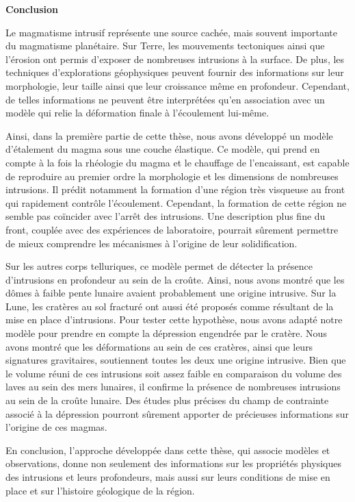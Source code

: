 \thispagestyle{plain}
\begin{center}
 \Large \vspace{.5cm} \textbf{Conclusion}
\end{center}

Le  magmatisme intrusif  représente  une source  cachée, mais  souvent
importante  du  magmatisme  planétaire.   Sur  Terre,  les  mouvements
tectoniques  ainsi que  l’érosion ont  permis d’exposer  de nombreuses
intrusions  à  la  surface.  De plus,  les  techniques  d'explorations
géophysiques peuvent  fournir des  informations sur  leur morphologie,
leur taille ainsi que leur  croissance même en profondeur.  Cependant,
de telles informations ne  peuvent être interprétées qu’en association
avec  un  modèle  qui  relie  la  déformation  finale  à  l’écoulement
lui-même.

Ainsi, dans la première partie de cette thèse, nous avons développé un
modèle d’étalement du magma sous  une couche élastique. Ce modèle, qui
prend en  compte à la  fois la rhéologie du  magma et le  chauffage de
l’encaissant,  est   capable  de   reproduire  au  premier   ordre  la
morphologie  et les  dimensions de  nombreuses intrusions.   Il prédit
notamment  la  formation d’une  région  très  visqueuse au  front  qui
rapidement contrôle  l’écoulement.  Cependant,  la formation  de cette
région  ne semble  pas  coïncider avec  l’arrêt  des intrusions.   Une
description  plus  fine du  front,  couplée  avec des  expériences  de
laboratoire,  pourrait  sûrement  permettre de  mieux  comprendre  les
mécanismes à l’origine de leur solidification.

Sur  les autres  corps telluriques,  ce modèle  permet de  détecter la
présence d’intrusions en profondeur au  sein de la croûte. Ainsi, nous
avons montré que les dômes à faible pente lunaire avaient probablement
une origine intrusive.  Sur la Lune,  les cratères au sol fracturé ont
aussi été proposés  comme résultant de la mise  en place d’intrusions.
Pour  tester cette  hypothèse,  nous avons  adapté  notre modèle  pour
prendre en compte la dépression  engendrée par le cratère.  Nous avons
montré que les  déformations au sein de ces cratères,  ainsi que leurs
signatures  gravitaires,  soutiennent  toutes  les  deux  une  origine
intrusive.   Bien que  le volume  réuni de  ces intrusions  soit assez
faible en comparaison  du volume des laves au sein  des mers lunaires,
il confirme la présence de nombreuses  intrusions au sein de la croûte
lunaire. Des études plus précises du  champ de contrainte associé à la
dépression pourront  sûrement apporter de précieuses  informations sur
l’origine de ces magmas.

En  conclusion, l’approche  développée dans  cette thèse,  qui associe
modèles et observations, donne non  seulement des informations sur les
propriétés physiques  des intrusions et leurs  profondeurs, mais aussi
sur leurs conditions de mise en  place et sur l’histoire géologique de
la région.






